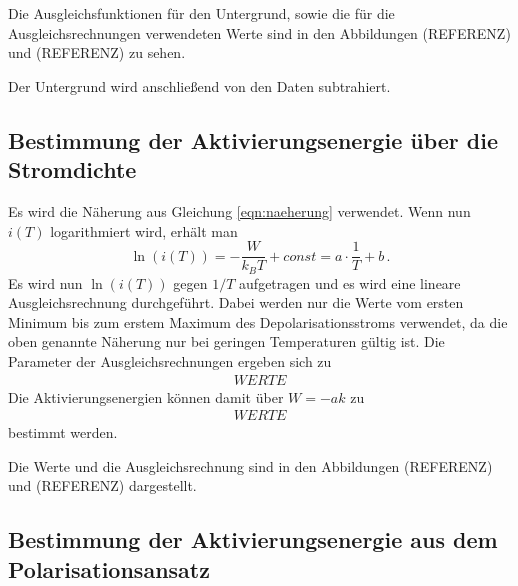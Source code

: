 Die Ausgleichsfunktionen für den Untergrund, sowie die für die Ausgleichsrechnungen
verwendeten Werte sind in den Abbildungen (REFERENZ) und (REFERENZ) zu sehen.


Der Untergrund wird anschließend von den Daten subtrahiert.

\subsection{Bestimmung der Aktivierungsenergie über die Stromdichte}

Es wird die Näherung aus Gleichung \eqref{eqn:naeherung} verwendet. Wenn nun $i(T)$
logarithmiert wird, erhält man
\begin{equation*}
  \ln(i(T))=-\frac{W}{k_B T} + const =a\cdot \frac{1}{T} +b  \,.
\end{equation*}
Es wird nun $\ln(i(T))$ gegen $1/T$ aufgetragen und es wird eine lineare Ausgleichsrechnung
durchgeführt. Dabei werden nur die Werte vom ersten Minimum bis zum erstem Maximum
des Depolarisationsstroms verwendet, da die oben genannte Näherung nur bei geringen
Temperaturen gültig ist. Die Parameter
der Ausgleichsrechnungen ergeben sich zu
\begin{align*}
  WERTE
\end{align*}
Die Aktivierungsenergien können damit über $W=-ak$ zu
\begin{align*}
 WERTE
\end{align*}
bestimmt werden.

Die Werte und die Ausgleichsrechnung sind in den Abbildungen (REFERENZ) und (REFERENZ)
dargestellt.


\subsection{Bestimmung der Aktivierungsenergie aus dem Polarisationsansatz}
